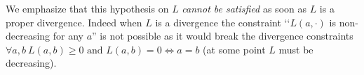 We emphasize that this hypothesis on $L$ \emph{cannot be satisfied} as soon as $L$ is a proper divergence. Indeed when $L$ is a divergence the constraint ‘‘$L(a, \cdot)$ is non-decreasing for any $a$'' is not possible as it would break the divergence constraints $\forall a,b \ L(a,b) \geq 0 \text{ and } L(a,b) = 0 \iff a = b$ (at some point $L$ must be decreasing).
